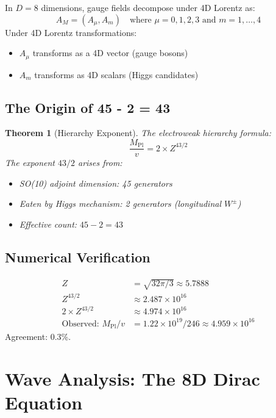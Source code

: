\documentclass[12pt,a4paper]{article}
\newtheorem{theorem}{Theorem}[section]
\begin{document}
In $D = 8$ dimensions, gauge fields decompose under 4D Lorentz as:
\begin{equation}
A_M = (A_\mu, A_m) \quad \text{where } \mu = 0,1,2,3 \text{ and } m = 1,\ldots,4
\end{equation}
Under 4D Lorentz transformations:
\begin{itemize}
    \item $A_\mu$ transforms as a 4D vector (gauge bosons)
    \item $A_m$ transforms as 4D scalars (Higgs candidates)
\end{itemize}

\subsection{The Origin of 45 - 2 = 43}

\begin{theorem}[Hierarchy Exponent]
The electroweak hierarchy formula:
\begin{equation}
\frac{M_{\text{Pl}}}{v} = 2 \times Z^{43/2}
\end{equation}
The exponent $43/2$ arises from:
\begin{itemize}
    \item SO(10) adjoint dimension: 45 generators
    \item Eaten by Higgs mechanism: 2 generators (longitudinal $W^\pm$)
    \item Effective count: $45 - 2 = 43$
\end{itemize}
\end{theorem}

\subsection{Numerical Verification}

\begin{align}
Z &= \sqrt{32\pi/3} \approx 5.7888 \\
Z^{43/2} &\approx 2.487 \times 10^{16} \\
2 \times Z^{43/2} &\approx 4.974 \times 10^{16} \\
\text{Observed: } M_{\text{Pl}}/v &= 1.22 \times 10^{19}/246 \approx 4.959 \times 10^{16}
\end{align}
Agreement: 0.3\%.

\section{Wave Analysis: The 8D Dirac Equation}
\end{document}
